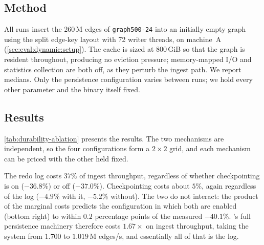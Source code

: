 \subsection{Method}
\label{sec:eval:dynamic:durability:method}

All runs insert the 260\,M edges of \texttt{graph500-24} into an initially empty graph using the split edge-key layout with 72 writer threads, on machine~A (\autoref{sec:eval:dynamic:setup}).
The \wt{} cache is sized at 800\,GiB so that the graph is resident throughout, producing no eviction pressure; memory-mapped I/O and statistics collection are both off, as they perturb the ingest path.
We report medians.
Only the persistence configuration varies between runs; we hold every other parameter and the binary itself fixed.

\subsection{Results}
\label{sec:eval:dynamic:durability:results}

\autoref{tab:durability-ablation} presents the results. The two mechanisms are independent, so the four configurations form a $2\times2$ grid, and each mechanism can be priced with the other held fixed.

The redo log costs $37\%$ of ingest throughput, regardless of whether checkpointing is on ($-36.8\%$) or off ($-37.0\%$).
Checkpointing costs about $5\%$, again regardless of the log ($-4.9\%$ with it, $-5.2\%$ without).
The two do not interact: the product of the marginal costs predicts the configuration in which both are enabled (bottom right) to within $0.2$ percentage points of the measured $-40.1\%$.
\project{}'s full persistence machinery therefore costs $1.67\times$ on ingest throughput, taking the system from $1.700$ to $1.019$\,M edges/s, and essentially all of that is the log.

